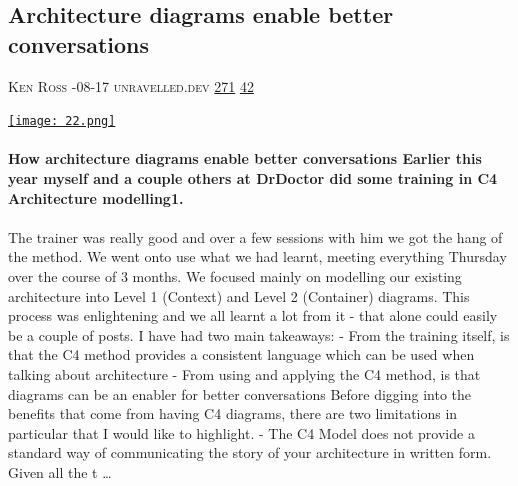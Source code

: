 \documentclass[10pt,a4paper]{article}
\begin{document}
\begin{multicols}{2}
\begin{minipage}{\linewidth}
\subsection{Architecture diagrams enable better conversations}
\textsc{\footnotesize
{\scriptsize\faUser}\space 
Ken Ross 
{\scriptsize\faCalendar}-08-17 
{\scriptsize\faGlobe}\space 
unravelled.dev 
{\scriptsize\faThumbsOUp}\space 
\href{http://news.ycombinator.com/item?id=37222855\&utm\_term=comment}{271} 
{\scriptsize\faComments}\space 
\href{http://news.ycombinator.com/item?id=37222855\&utm\_term=comment}{42} 
}
\par\medskip\noindent
\href{https://www.unravelled.dev/how-architecture-diagrams-enable-better-conversations/?utm\_source=hackernewsletter\&utm\_medium=email\&utm\_term=code}{
    \texttt{[image: 22.png]}
}
\end{minipage}
\paragraph{}
\textbf{How architecture diagrams enable better conversations
Earlier this year myself and a couple others at DrDoctor did some training in C4 Architecture modelling1.}
\paragraph{}
 The trainer was really good and over a few sessions with him we got the hang of the method. We went onto use what we had learnt, meeting everything Thursday over the course of 3 months. We focused mainly on modelling our existing architecture into Level 1 (Context) and Level 2 (Container) diagrams. This process was enlightening and we all learnt a lot from it - that alone could easily be a couple of posts.
I have had two main takeaways:
- From the training itself, is that the C4 method provides a consistent language which can be used when talking about architecture
- From using and applying the C4 method, is that diagrams can be an enabler for better conversations
Before digging into the benefits that come from having C4 diagrams, there are two limitations in particular that I would like to highlight.
-
The C4 Model does not provide a standard way of communicating the story of your architecture in written form. Given all the t
\dots\par
\noindent\begin{minipage}{\linewidth}
\medskip

\end{minipage}
\end{multicols}
\end{document}
